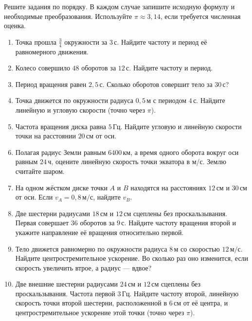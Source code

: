 \documentclass[a4paper,12pt]{article}
\newcommand{\topic}[1]{\vspace{0.3em}{\large\bfseries\color{darkaccent}#1}\par\vspace{0.1em}{\color{rulegray}\rule{\linewidth}{0.5pt}}\vspace{0.05em}}
\newcommand{\unit}[1]{\,\text{#1}}
\begin{document}
\clearpage
\topic{Тренировочный блок \texorpdfstring{\quad}{ }\textnormal{(Путь А)}}
Решите задания по порядку. В каждом случае запишите исходную формулу и необходимые преобразования. Используйте $\pi\approx3{,}14$, если требуется численная оценка.
\begin{enumerate}
 \item Точка прошла $\frac34$ окружности за $3\unit{с}$. Найдите частоту и период её равномерного движения.
 \item Колесо совершило $48$ оборотов за $12\unit{с}$. Найдите частоту и период.
 \item Период вращения равен $2{,}5\unit{с}$. Сколько оборотов совершит тело за $30\unit{с}$?
 \item Точка движется по окружности радиуса $0{,}5\unit{м}$ с периодом $4\unit{с}$. Найдите линейную и угловую скорости (точно через $\pi$).
 \item Частота вращения диска равна $5\unit{Гц}$. Найдите угловую и линейную скорости точки на расстоянии $20\unit{см}$ от оси.
 \item Полагая радиус Земли равным $6400\unit{км}$, а время одного оборота вокруг оси равным $24\unit{ч}$, оцените линейную скорость точки экватора в м/с. Землю считайте шаром.
 \item На одном жёстком диске точки $A$ и $B$ находятся на расстояниях $12\unit{см}$ и $30\unit{см}$ от оси. Если $v_A=0{,}8\unit{м/с}$, найдите $v_B$.
 \item Две шестерни радиусами $18\unit{см}$ и $12\unit{см}$ сцеплены без проскальзывания. Первая совершает $36$ оборотов за $9\unit{с}$. Найдите частоту вращения второй и укажите направление её вращения относительно первой.
 \item Тело движется равномерно по окружности радиуса $8\unit{м}$ со скоростью $12\unit{м/с}$. Найдите центростремительное ускорение. Во сколько раз оно изменится, если скорость увеличить втрое, а радиус --- вдвое?
 \item Две внешние шестерни радиусами $24\unit{см}$ и $12\unit{см}$ сцеплены без проскальзывания. Частота первой $3\unit{Гц}$. Найдите частоту второй, линейную скорость точки второй шестерни, расположенной в $6\unit{см}$ от её центра, и центростремительное ускорение этой точки (точно через $\pi$).
\end{enumerate}
\end{document}
